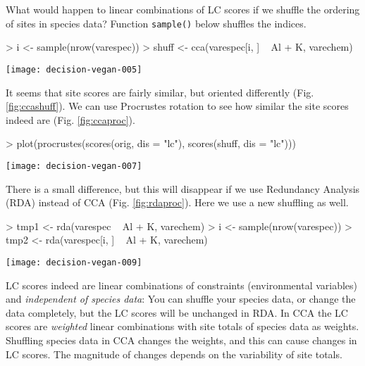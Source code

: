 \documentclass[a4paper,10pt]{amsart}
\begin{document}
What would happen to linear combinations of LC scores if we shuffle
the ordering of sites in species data?  Function \texttt{sample()} below
shuffles the indices.
\begin{Schunk}
\begin{Sinput}
> i <- sample(nrow(varespec))
> shuff <- cca(varespec[i, ] ~ Al + K, varechem)
\end{Sinput}
\end{Schunk}
\begin{SCfigure}
\texttt{[image: decision-vegan-005]}
\caption{LC scores of shuffled species data.}
\label{fig:ccashuff}
\end{SCfigure}
It seems that site scores are fairly similar, but oriented differently
(Fig. \ref{fig:ccashuff}).  We can use Procrustes rotation to see how
similar the site scores indeed are (Fig. \ref{fig:ccaproc}).
\begin{Schunk}
\begin{Sinput}
> plot(procrustes(scores(orig, dis = "lc"), scores(shuff, dis = "lc")))
\end{Sinput}
\end{Schunk}
\begin{SCfigure}
\texttt{[image: decision-vegan-007]}
\caption{Procrustes rotation of LC scores from CCA of original and shuffled data.}
\label{fig:ccaproc}
\end{SCfigure}
There is a small difference, but this will disappear if we use
Redundancy Analysis (RDA) instead of CCA
(Fig. \ref{fig:rdaproc}). Here we use a new shuffling as well.
\begin{Schunk}
\begin{Sinput}
> tmp1 <- rda(varespec ~ Al + K, varechem)
> i <- sample(nrow(varespec))
> tmp2 <- rda(varespec[i, ] ~ Al + K, varechem)
\end{Sinput}
\end{Schunk}
\begin{SCfigure}
\texttt{[image: decision-vegan-009]}
\caption{Procrustes rotation of LC scores in RDA of the original and shuffled data.}
\label{fig:rdaproc}
\end{SCfigure}

LC scores indeed are linear combinations of constraints (environmental
variables) and \emph{independent of species data}: You can
shuffle your species data, or change the data completely, but the LC
scores will be unchanged in RDA.  In CCA the LC scores are
\emph{weighted} linear combinations with site totals of species data
as weights. Shuffling species data in CCA changes the weights, and
this can cause changes in LC scores.  The magnitude of changes depends
on the variability of site totals.
\end{document}
